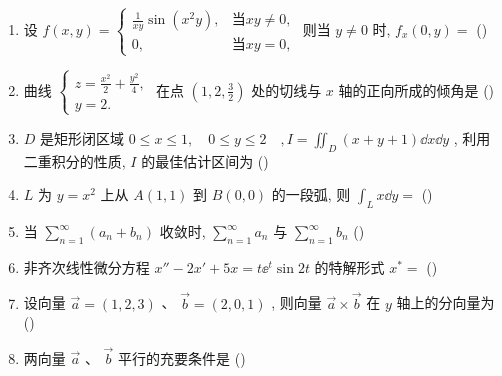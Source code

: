 \begin{enumerate}
	\item 设 $f(x,y)=\begin{cases}
	\frac{1}{xy}\sin\left(x^2y\right), & \text{当}xy\ne0,\\
	0, & \text{当}xy=0,
	\end{cases}$ 则当 $y\ne0$ 时, $f_{x}(0,y)=$ (\hspace{1pc})
	
	\item 曲线 $\begin{cases}
	z=\frac{x^2}{2}+\frac{y^2}{4},\\
	y=2.
	\end{cases}$ 在点 $\left( 1,2,\frac{3}{2} \right)$ 处的切线与 $x$ 轴的正向所成的倾角是 (\hspace{1pc})
	
	\item $D$ 是矩形闭区域 $0 \leq x \leq 1, \quad 0 \leq y \leq 2 \quad, I=\iint_{D}(x+y+1) \dd x \dd y$ , 利用二重积分的性质, $I$ 的最佳估计区间为 (\hspace{1pc})
	
	\item $L$ 为 $y=x^2$ 上从 $A(1,1)$ 到 $B(0,0)$ 的一段弧, 则 $\int_{L}x\dd y=$ (\hspace{1pc})

	\item 当 $\sum_{n=1}^{\infty}\left(a_{n}+b_{n}\right)$ 收敛时, $\sum_{n=1}^{\infty} a_{n}$ 与 $\sum_{n=1}^{\infty} b_{n}$ (\hspace{1pc})
	
	\item 非齐次线性微分方程 $x''-2 x'+5 x=t \ee^{t} \sin 2 t$ 的特解形式 $x^*=$ (\hspace{1pc})
	
	\item 设向量 $\vec{a}=(1,2,3)$ 、 $\vec{b}=(2,0,1)$ , 则向量 $\vec{a}\times\vec{b}$ 在 $y$ 轴上的分向量为 (\hspace{1pc})
	
	\item 两向量 $\vec{a}$ 、 $\vec{b}$ 平行的充要条件是 (\hspace{1pc})
	

\end{enumerate}
